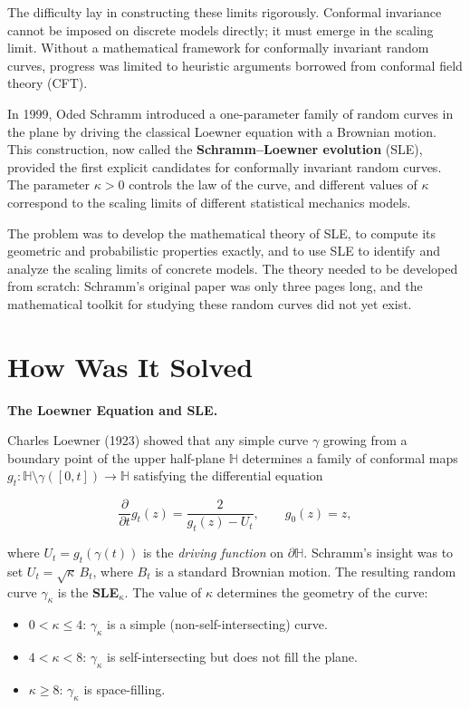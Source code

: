 The difficulty lay in constructing these limits rigorously. Conformal invariance cannot be imposed on discrete models directly; it must emerge in the scaling limit. Without a mathematical framework for conformally invariant random curves, progress was limited to heuristic arguments borrowed from conformal field theory (CFT).

In 1999, Oded Schramm introduced a one-parameter family of random curves in the plane by driving the classical Loewner equation with a Brownian motion. This construction, now called the \textbf{Schramm--Loewner evolution} (SLE), provided the first explicit candidates for conformally invariant random curves. The parameter $\kappa > 0$ controls the law of the curve, and different values of $\kappa$ correspond to the scaling limits of different statistical mechanics models.

The problem was to develop the mathematical theory of SLE, to compute its geometric and probabilistic properties exactly, and to use SLE to identify and analyze the scaling limits of concrete models. The theory needed to be developed from scratch: Schramm's original paper was only three pages long, and the mathematical toolkit for studying these random curves did not yet exist.

\section{How Was It Solved}\label{ch2006wendelinwerner:how-was-it-solved}

\textbf{The Loewner Equation and SLE.}

Charles Loewner (1923) showed that any simple curve $\gamma$ growing from a boundary point of the upper half-plane $\mathbb{H}$ determines a family of conformal maps $g_t: \mathbb{H} \setminus \gamma([0,t]) \to \mathbb{H}$ satisfying the differential equation

\[
\frac{\partial}{\partial t} g_t(z) = \frac{2}{g_t(z) - U_t}, \qquad g_0(z) = z,
\]

where $U_t = g_t(\gamma(t))$ is the \emph{driving function} on $\partial\mathbb{H}$. Schramm's insight was to set $U_t = \sqrt{\kappa}\, B_t$, where $B_t$ is a standard Brownian motion. The resulting random curve $\gamma_\kappa$ is the \textbf{SLE$_\kappa$}. The value of $\kappa$ determines the geometry of the curve:

\begin{itemize}
  \item $0 < \kappa \leq 4$: $\gamma_\kappa$ is a simple (non-self-intersecting) curve.
  \item $4 < \kappa < 8$: $\gamma_\kappa$ is self-intersecting but does not fill the plane.
  \item $\kappa \geq 8$: $\gamma_\kappa$ is space-filling.
\end{itemize}


